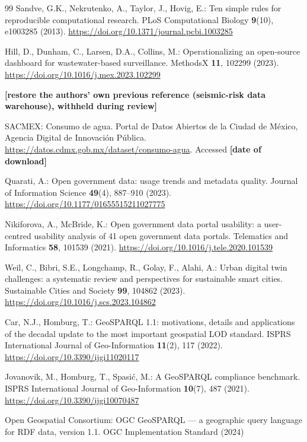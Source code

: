 \documentclass[runningheads]{llncs}
\renewcommand{\_}{\origunderscore\allowbreak}
\newif\ifshowchanges
\newcommand{\new}[1]{\ifshowchanges\textcolor{chg}{#1}\else#1\fi}
\newcommand{\fillin}[1]{\textcolor{todo}{\textbf{[#1]}}}
\begin{document}
\begin{thebibliography}{99}
 Sandve, G.K., Nekrutenko, A., Taylor, J., Hovig, E.: Ten simple rules for reproducible computational research. PLoS Computational Biology \textbf{9}(10), e1003285 (2013). \url{https://doi.org/10.1371/journal.pcbi.1003285}

 Hill, D., Dunham, C., Larsen, D.A., Collins, M.: Operationalizing an open-source dashboard for wastewater-based surveillance. MethodsX \textbf{11}, 102299 (2023). \url{https://doi.org/10.1016/j.mex.2023.102299}

 \fillin{restore the authors' own previous reference (seismic-risk data warehouse), withheld during review}

 SACMEX: Consumo de agua. Portal de Datos Abiertos de la Ciudad de M\'exico, Agencia Digital de Innovaci\'on P\'ublica. \url{https://datos.cdmx.gob.mx/dataset/consumo-agua}. \new{Accessed \fillin{date of download}}

 Quarati, A.: Open government data: usage trends and metadata quality. Journal of Information Science \textbf{49}(4), 887--910 (2023). \url{https://doi.org/10.1177/01655515211027775}

 Nikiforova, A., McBride, K.: Open government data portal usability: a user-centred usability analysis of 41 open government data portals. Telematics and Informatics \textbf{58}, 101539 (2021). \url{https://doi.org/10.1016/j.tele.2020.101539}

 Weil, C., Bibri, S.E., Longchamp, R., Golay, F., Alahi, A.: Urban digital twin challenges: a systematic review and perspectives for sustainable smart cities. Sustainable Cities and Society \textbf{99}, 104862 (2023). \url{https://doi.org/10.1016/j.scs.2023.104862}

 Car, N.J., Homburg, T.: GeoSPARQL 1.1: motivations, details and applications of the decadal update to the most important geospatial LOD standard. ISPRS International Journal of Geo-Information \textbf{11}(2), 117 (2022). \url{https://doi.org/10.3390/ijgi11020117}

 Jovanovik, M., Homburg, T., Spasi\'c, M.: A GeoSPARQL compliance benchmark. ISPRS International Journal of Geo-Information \textbf{10}(7), 487 (2021). \url{https://doi.org/10.3390/ijgi10070487}

 Open Geospatial Consortium: OGC GeoSPARQL --- a geographic query language for RDF data, version 1.1. OGC Implementation Standard (2024)


\end{thebibliography}
\end{document}
